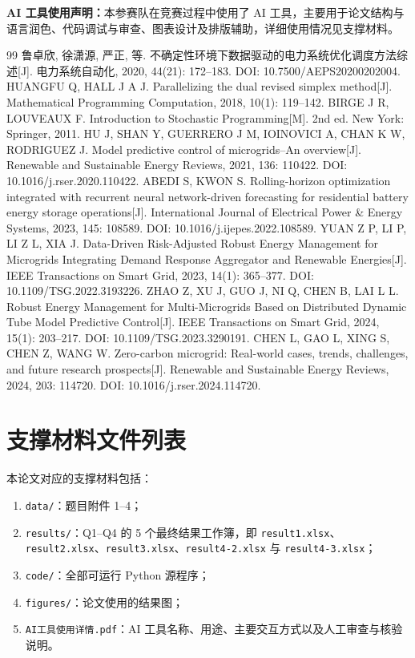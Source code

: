 \documentclass[withoutpreface]{cumcmthesis}
\begin{document}
\par\noindent\textbf{AI 工具使用声明：}本参赛队在竞赛过程中使用了 AI 工具，主要用于论文结构与语言润色、代码调试与审查、图表设计及排版辅助，详细使用情况见支撑材料。

\clearpage
\begin{thebibliography}{99}
 鲁卓欣, 徐潇源, 严正, 等. 不确定性环境下数据驱动的电力系统优化调度方法综述[J]. 电力系统自动化, 2020, 44(21): 172--183. DOI: 10.7500/AEPS20200202004.
 HUANGFU Q, HALL J A J. Parallelizing the dual revised simplex method[J]. Mathematical Programming Computation, 2018, 10(1): 119--142.
 BIRGE J R, LOUVEAUX F. Introduction to Stochastic Programming[M]. 2nd ed. New York: Springer, 2011.
 HU J, SHAN Y, GUERRERO J M, IOINOVICI A, CHAN K W, RODRIGUEZ J. Model predictive control of microgrids--An overview[J]. Renewable and Sustainable Energy Reviews, 2021, 136: 110422. DOI: 10.1016/j.rser.2020.110422.
 ABEDI S, KWON S. Rolling-horizon optimization integrated with recurrent neural network-driven forecasting for residential battery energy storage operations[J]. International Journal of Electrical Power \& Energy Systems, 2023, 145: 108589. DOI: 10.1016/j.ijepes.2022.108589.
 YUAN Z P, LI P, LI Z L, XIA J. Data-Driven Risk-Adjusted Robust Energy Management for Microgrids Integrating Demand Response Aggregator and Renewable Energies[J]. IEEE Transactions on Smart Grid, 2023, 14(1): 365--377. DOI: 10.1109/TSG.2022.3193226.
 ZHAO Z, XU J, GUO J, NI Q, CHEN B, LAI L L. Robust Energy Management for Multi-Microgrids Based on Distributed Dynamic Tube Model Predictive Control[J]. IEEE Transactions on Smart Grid, 2024, 15(1): 203--217. DOI: 10.1109/TSG.2023.3290191.
 CHEN L, GAO L, XING S, CHEN Z, WANG W. Zero-carbon microgrid: Real-world cases, trends, challenges, and future research prospects[J]. Renewable and Sustainable Energy Reviews, 2024, 203: 114720. DOI: 10.1016/j.rser.2024.114720.
\end{thebibliography}

\clearpage
\appendix
\section{支撑材料文件列表}
本论文对应的支撑材料包括：
\begin{enumerate}
\item \texttt{data/}：题目附件 1--4；
\item \texttt{results/}：Q1--Q4 的 5 个最终结果工作簿，即 \texttt{result1.xlsx}、\texttt{result2.xlsx}、\texttt{result3.xlsx}、\texttt{result4-2.xlsx} 与 \texttt{result4-3.xlsx}；
\item \texttt{code/}：全部可运行 Python 源程序；
\item \texttt{figures/}：论文使用的结果图；
\item \texttt{AI工具使用详情.pdf}：AI 工具名称、用途、主要交互方式以及人工审查与核验说明。
\end{enumerate}
\end{document}
